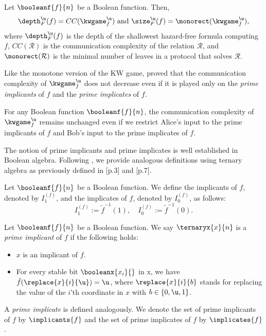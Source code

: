 \documentclass[acmsmall, nonacm, authorversion]{acmart}
\begin{document}
\begin{theorem}[{\cite[Theorem 7]{IK23}}]\label{thm:kw-hazard-free}
Let $\booleanf{f}{n}$ be a Boolean function. Then,
\[
    \text{$\depth_{F}^{\u}(f)=CC(\kwgame_{f}^{\u})$ and $\size_{F}^{\u}(f)=\monorect(\kwgame_{f}^{\u})$},
\]
where $\depth_{F}^{\u}(f)$ is the depth of the shallowest hazard-free formula computing $f$, $CC(\mathcal{R})$ is the communication complexity of the relation $\mathcal{R}$, and $\monorect(\mathcal{R})$ is the minimal number of leaves in a protocol that solves $\mathcal{R}$.
\end{theorem}

Like the monotone version of the KW game, \cite{IK23} proved that the communication complexity of $\kwgame_{f}^{\u}$ does not decrease even if it is played only on the \emph{prime implicants} of $f$ and the \emph{prime implicates} of $f$. 
\begin{theorem}[{\cite[Theorem 10]{IK23}}]\label{thm:kw-hazard-free-implicants}
For any Boolean function $\booleanf{f}{n}$, the communication complexity of $\kwgame_{f}^{\u}$ remains unchanged even if we restrict Alice's input to the prime implicants of $f$ and Bob's input to the prime implicates of $f$.
\end{theorem}
The notion of prime implicants and prime implicates is well established in Boolean algebra. Following \cite{IK23}, we provide analogous definitions using ternary algebra as previously defined in \cite{KS20}[p.3] and \cite{IK23}[p.7].

\begin{definition}\label{def:implicant}
Let $\booleanf{f}{n}$ be a Boolean function. We define the implicants of $f$, denoted by $I^{(f)}_1$, and the implicates of $f$, denoted by $I^{(f)}_0$, as follows: 
\[
I^{(f)}_1:=\tilde{f}^{-1}(1), \quad I^{(f)}_0:=\tilde{f}^{-1}(0).
\]
\end{definition}

\begin{definition}\label{def:prime-implicant}
Let $\booleanf{f}{n}$ be a Boolean function.
We say $\ternaryx{x}{n}$ is a \emph{prime implicant} of $f$ if the following holds:
\begin{itemize}
    \item $x$ is an implicant of $f$.
    \item For every stable bit $\booleanx{x_i}{}$ in x, we have $\tilde{f}(\replace{x}{i}{\u})=\u$, where $\replace{x}{i}{b}$ stands for replacing the value of the $i$'th coordinate in $x$ with $b\in\{0,\u, 1\}$.
\end{itemize}
A \emph{prime implicate} is defined analogously. We denote the set of prime implicants of $f$ by $\implicants{f}$ and the set of prime implicates of $f$ by $\implicates{f}$.
\end{definition}
\end{document}
